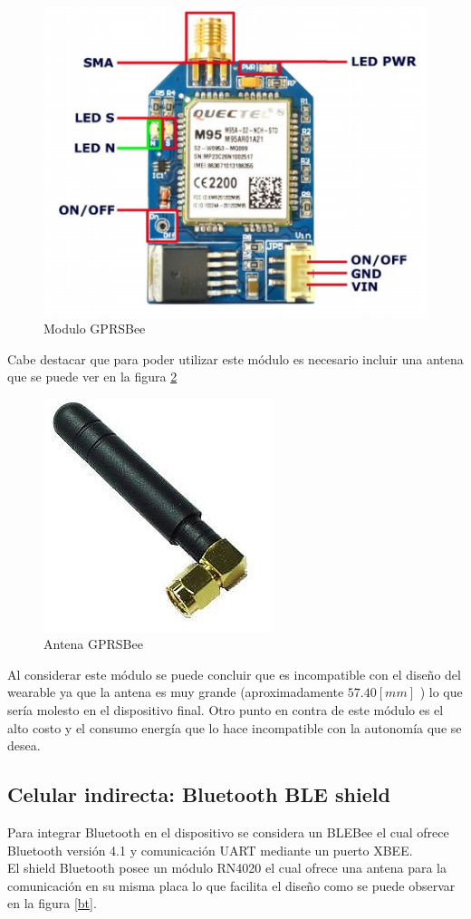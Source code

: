 \begin{figure}[H]
\centering
\includegraphics[scale=0.8]{figuras/com/gprs.png}
\caption{Modulo GPRSBee}
\label{gprs}
\end{figure}

Cabe destacar que para poder utilizar este módulo es necesario incluir una antena que se puede ver en la figura \ref{antena}

\begin{figure}[H]
\centering
\includegraphics[scale=0.5]{figuras/com/antena.jpg}
\caption{Antena GPRSBee}
\label{antena}
\end{figure}

Al considerar este módulo se puede concluir que es incompatible con el diseño del wearable ya que la antena es muy grande (aproximadamente $57.40[mm]$ ) lo que sería molesto en el dispositivo final. Otro punto en contra de este módulo es el alto costo y el consumo energía que lo hace incompatible con la autonomía que se desea.

\subsection{Celular indirecta: Bluetooth BLE shield}
Para integrar Bluetooth en el dispositivo se considera un BLEBee el cual ofrece Bluetooth versión 4.1 y comunicación UART mediante un puerto XBEE. \\
El shield Bluetooth posee un módulo RN4020\cite{RN4020} el cual ofrece una antena para la comunicación en su misma placa lo que facilita el diseño como se puede observar en la figura \ref{bt}.

